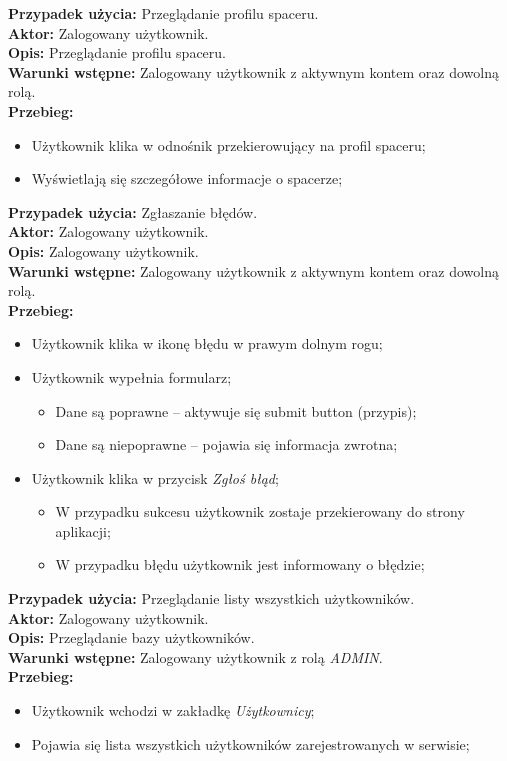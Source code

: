 \noindent
\textbf{Przypadek użycia:} Przeglądanie profilu spaceru. \\
\textbf{Aktor:} Zalogowany użytkownik. \\
\textbf{Opis:} Przeglądanie profilu spaceru. \\
\textbf{Warunki wstępne:} Zalogowany użytkownik z aktywnym kontem oraz dowolną rolą. \\
\textbf{Przebieg:}
\begin{itemize}
    \item Użytkownik klika w odnośnik przekierowujący na profil spaceru;
    \item Wyświetlają się szczegółowe informacje o spacerze;
\end{itemize}

\noindent
\textbf{Przypadek użycia:} Zgłaszanie błędów. \\
\textbf{Aktor:} Zalogowany użytkownik. \\
\textbf{Opis:}  Zalogowany użytkownik. \\
\textbf{Warunki wstępne:} Zalogowany użytkownik z aktywnym kontem oraz dowolną rolą. \\
\textbf{Przebieg:}
\begin{itemize}
    \item Użytkownik klika w ikonę błędu w prawym dolnym rogu;
    \item Użytkownik wypełnia formularz;
    \begin{itemize}
        \item Dane są poprawne -- aktywuje się submit button (przypis);
        \item Dane są niepoprawne -- pojawia się informacja zwrotna;
    \end{itemize}
    \item Użytkownik klika w przycisk \textit{Zgłoś błąd};
    \begin{itemize}
        \item W przypadku sukcesu użytkownik zostaje przekierowany do strony aplikacji;
        \item W przypadku błędu użytkownik jest informowany o błędzie;
    \end{itemize}
\end{itemize}

\noindent
\textbf{Przypadek użycia:} Przeglądanie listy wszystkich użytkowników. \\
\textbf{Aktor:} Zalogowany użytkownik. \\
\textbf{Opis:} Przeglądanie bazy użytkowników. \\
\textbf{Warunki wstępne:} Zalogowany użytkownik z rolą \textit{ADMIN}. \\
\textbf{Przebieg:}
\begin{itemize}
    \item Użytkownik wchodzi w zakładkę \textit{Użytkownicy};
    \item Pojawia się lista wszystkich użytkowników zarejestrowanych w serwisie;
\end{itemize}

